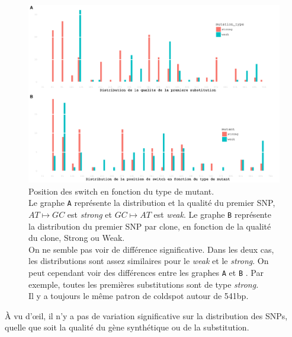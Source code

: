\documentclass[a4paper]{tufte-handout}
\begin{document}
\begin{figure}
  \includegraphics[width=\linewidth]{../switch_pos_by_mutant.pdf}
  \caption{Position des switch en fonction du type de mutant. \\
    Le graphe \texttt{A} représente la distribution et la qualité du premier
    SNP, $AT \mapsto GC$ est \emph{strong} et $GC \mapsto AT$ est \emph{weak}.
    Le graphe \texttt{B} représente la distribution du premier SNP par clone, en
    fonction de la qualité du clone, Strong ou Weak. \\
    On ne semble pas voir de différence significative. Dans les deux cas, les
    distributions sont assez similaires pour le \emph{weak} et le \emph{strong}.
    On peut cependant voir des différences entre les graphes \texttt{A} et
    \texttt{B} . Par exemple, toutes les premières substitutions sont de type
    \emph{strong.} \\
    Il y a toujours le même patron de coldspot autour de 541bp.}
\end{figure}

À vu d'œil, il n'y a pas de variation significative sur la distribution des
SNPs, quelle que soit la qualité du gène synthétique ou de la substitution. 
\end{document}
